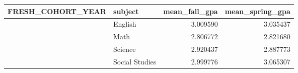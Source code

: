 \begin{tabular}{r|l|r|r}
\hline
FRESH\_COHORT\_YEAR & subject & mean\_fall\_gpa & mean\_spring\_gpa\\
\hline
 & English & 3.009590 & 3.035437\\
\cline{2-4}
 & Math & 2.806772 & 2.821680\\
\cline{2-4}
 & Science & 2.920437 & 2.887773\\
\cline{2-4}
\multirow{-4}{*}{\raggedleft\arraybackslash 2013} & Social Studies & 2.999776 & 3.065307\\
\hline
\end{tabular}